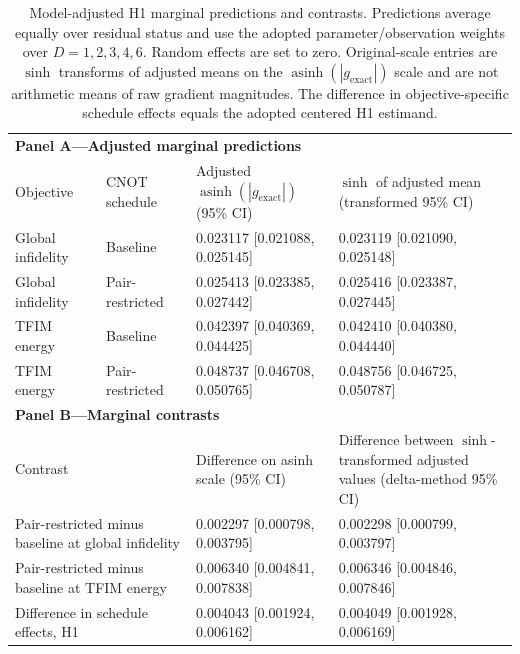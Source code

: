 \documentclass[pdflatex,sn-mathphys-num,Numbered]{sn-jnl}
\begin{document}
\begin{table}[t]
\centering
\small
\caption{Model-adjusted H1 marginal predictions and contrasts. Predictions average equally over residual status and use the adopted parameter/observation weights over $D=1,2,3,4,6$. Random effects are set to zero. Original-scale entries are $\sinh$ transforms of adjusted means on the $\operatorname{asinh}(|g_{\mathrm{exact}}|)$ scale and are not arithmetic means of raw gradient magnitudes. The difference in objective-specific schedule effects equals the adopted centered H1 estimand.}
\label{tab:h1-marginal-effects}
\begin{tabularx}{\textwidth}{@{}llXX@{}}
\toprule
\multicolumn{4}{l}{\textbf{Panel A---Adjusted marginal predictions}}\\
Objective & CNOT schedule & Adjusted $\operatorname{asinh}(|g_{\mathrm{exact}}|)$ (95\% CI) & $\sinh$ of adjusted mean (transformed 95\% CI)\\
\midrule
Global infidelity & Baseline & 0.023117 [0.021088, 0.025145] & 0.023119 [0.021090, 0.025148]\\
Global infidelity & Pair-restricted & 0.025413 [0.023385, 0.027442] & 0.025416 [0.023387, 0.027445]\\
TFIM energy & Baseline & 0.042397 [0.040369, 0.044425] & 0.042410 [0.040380, 0.044440]\\
TFIM energy & Pair-restricted & 0.048737 [0.046708, 0.050765] & 0.048756 [0.046725, 0.050787]\\
\midrule
\multicolumn{4}{l}{\textbf{Panel B---Marginal contrasts}}\\
\multicolumn{2}{p{0.30\textwidth}}{Contrast} & Difference on asinh scale (95\% CI) & Difference between $\sinh$-transformed adjusted values (delta-method 95\% CI)\\
\midrule
\multicolumn{2}{p{0.30\textwidth}}{Pair-restricted minus baseline at global infidelity} & 0.002297 [0.000798, 0.003795] & 0.002298 [0.000799, 0.003797]\\
\multicolumn{2}{p{0.30\textwidth}}{Pair-restricted minus baseline at TFIM energy} & 0.006340 [0.004841, 0.007838] & 0.006346 [0.004846, 0.007846]\\
\multicolumn{2}{p{0.30\textwidth}}{Difference in schedule effects, H1} & 0.004043 [0.001924, 0.006162] & 0.004049 [0.001928, 0.006169]\\
\bottomrule
\end{tabularx}
\end{table}
\end{document}
